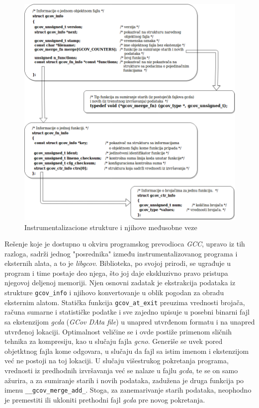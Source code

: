 \documentclass[12pt,oneside]{memoir}
\newcommand{\kod}[1]{\texttt{#1}}
\newcommand{\strano}[1]{\textit{#1}}
\begin{document}
\begin{figure}[!ht]
  \centering
  \includegraphics[width=\textwidth]{img/instr_strukture_3.png}
  \caption{Instrumentalizacione strukture i njihove međusobne veze}
  \label{fig:instr}
\end{figure}

Rešenje koje je dostupno u okviru programskog prevodioca \strano{GCC}, upravo iz tih razloga, sadrži jednog "posrednika" između instrumentalizovanog programa i eksternih alata, a to je \strano{libgcov}. Biblioteka, po svojoj prirodi, se ugrađuje u program i time postaje deo njega, što joj daje ekskluzivno pravo pristupa njegovoj deljenoj memoriji. Njen osnovni zadatak je ekstrakcija podataka iz strukture \kod{gcov\_info} i njihovo konvertovanje u oblik pogodan za obradu eksternim alatom. Statička funkcija \kod{gcov\_at\_exit} preuzima vrednosti brojača, računa sumarne i statističke podatke i sve zajedno upisuje u posebni binarni fajl sa ekstenzijom \strano{gcda} (\strano{GCov DAta file}) u unapred utvrđenom formatu i na unapred utvrđenoj lokaciji. Optimalnost veličine se i ovde postiže primenom sličnih tehnika za kompresiju, kao u slučaju fajla \strano{gcno}. Generiše se uvek pored objetktnog fajla kome odgovara, u slučaju da fajl sa istim imenom i ekstenzijom već ne postoji na toj lokaciji. U slučaju višestrukog pokretanja programa, vrednosti iz predhodnih izvršavanja već se nalaze u fajlu \strano{gcda}, te se on samo ažurira, a za sumiranje starih i novih podataka, zadužena je druga funkcija po imenu \kod{\_\_gcov\_merge\_add\_}. Stoga, za zanemarivanje starih podataka, neophodno je premestiti ili ukloniti prethodni fajl \strano{gcda} pre novog pokretanja.  
\end{document}
